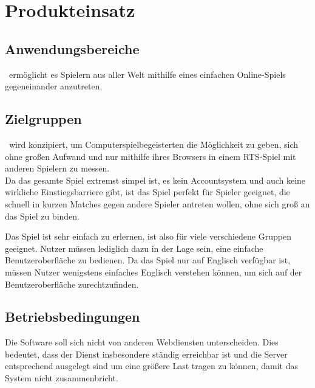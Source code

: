 \section{Produkteinsatz}

\subsection{Anwendungsbereiche}
\vires\ ermöglicht es Spielern aus aller Welt mithilfe eines einfachen Online-Spiels gegeneinander anzutreten.

\subsection{Zielgruppen}
\vires\ wird konzipiert, um Computerspielbegeisterten die Möglichkeit zu geben, sich ohne großen Aufwand und nur mithilfe ihres Browsers in einem RTS-Spiel mit anderen Spielern zu messen. \\ 
Da das gesamte Spiel extremst simpel ist, es kein Accountsystem und auch keine wirkliche Einstiegsbarriere gibt, ist das Spiel perfekt für Spieler geeignet, die schnell in kurzen Matches gegen andere Spieler antreten wollen, ohne sich groß an das Spiel zu binden.

Das Spiel ist sehr einfach zu erlernen, ist also für viele verschiedene Gruppen geeignet. Nutzer müssen lediglich dazu in der Lage sein, eine einfache Benutzeroberfläche zu bedienen. Da das Spiel nur auf Englisch verfügbar ist, müssen Nutzer wenigstens einfaches Englisch verstehen können, um sich auf der Benutzeroberfläche zurechtzufinden.

\subsection{Betriebsbedingungen}
Die Software soll sich nicht von anderen Webdiensten unterscheiden. Dies bedeutet, dass der Dienst insbesondere ständig erreichbar ist und die Server entsprechend ausgelegt sind um eine größere Last tragen zu können, damit das System nicht zusammenbricht.